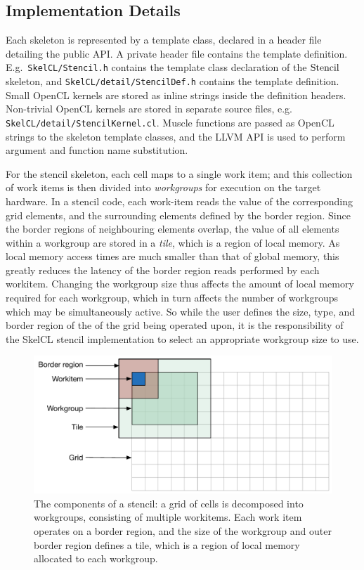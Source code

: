 \subsection{Implementation Details}

Each skeleton is represented by a template class, declared in a header
file detailing the public API. A private header file contains the
template definition. E.g.\ \texttt{SkelCL/Stencil.h} contains the
template class declaration of the $\operatorname*{Stencil}$ skeleton, and
\texttt{SkelCL/detail/StencilDef.h} contains the template
definition. Small OpenCL kernels are stored as inline strings inside
the definition headers. Non-trivial OpenCL kernels are stored in
separate source files,
e.g. \texttt{SkelCL/detail/StencilKernel.cl}. Muscle functions are
passed as OpenCL strings to the skeleton template classes, and the
LLVM API is used to perform argument and function name substitution.

For the stencil skeleton, each cell maps to a single work item; and
this collection of work items is then divided into \emph{workgroups}
for execution on the target hardware. In a stencil code, each
work-item reads the value of the corresponding grid elements, and the
surrounding elements defined by the border region. Since the border
regions of neighbouring elements overlap, the value of all elements
within a workgroup are stored in a \emph{tile}, which is a region of
local memory. As local memory access times are much smaller than that
of global memory, this greatly reduces the latency of the border
region reads performed by each workitem. Changing the workgroup size
thus affects the amount of local memory required for each workgroup,
which in turn affects the number of workgroups which may be
simultaneously active. So while the user defines the size, type, and
border region of the of the grid being operated upon, it is the
responsibility of the SkelCL stencil implementation to select an
appropriate workgroup size to use.

\begin{figure}
\centering
\includegraphics[width=.75\textwidth]{img/stencil-wg}
\caption{%
  The components of a stencil: a grid of cells is decomposed into
  workgroups, consisting of multiple workitems. Each work item
  operates on a border region, and the size of the workgroup and outer
  border region defines a tile, which is a region of local memory
  allocated to each workgroup.%
}
\label{fig:stencil-wg}
\end{figure}


